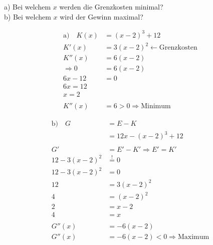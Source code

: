 a) Bei welchem \( x \) werden die Grenzkosten minimal? \\
b) Bei welchem \( x \) wird der Gewinn maximal?

\begin{align*}
    \text{a)}\quad K(x) &= (x-2)^3 + 12 \\
    K'(x) &= 3(x-2)^2 \leftarrow \text{Grenzkosten} \\
    K''(x) &= 6(x-2) \\
    \Rightarrow 0 &= 6(x-2) \\
    6x - 12 &= 0 \\
    6x = 12 \\
    x = 2 \\
    \\
    K''(x) &= 6 > 0 \Rightarrow \text{Minimum}
\end{align*}

\begin{align*}
    \text{b)}\quad G &= E - K \\
    &= 12x - (x-2)^3 + 12 \\
    \\
    G' &= E'-K' \Rightarrow E' = K' \\
    12 - 3(x-2)^2 &\overset{!}{=} 0 \\
    12 - 3(x-2)^2 &= 0 \\
    12 &= 3(x-2)^2 \\
    4 &= (x-2)^2 \\
    2 &= x-2 \\
    4 &= x \\
    \\
    G''(x) &= -6(x-2) \\
    G''(x) &= -6(x-2) < 0 \Rightarrow \text{Maximum}
\end{align*}
